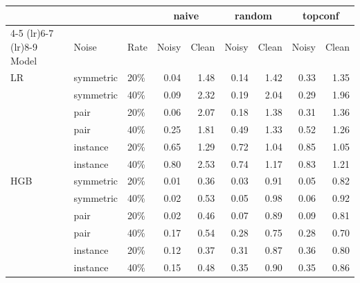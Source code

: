 \begin{tabular}{lllrrrrrr}
\toprule
 & & & \multicolumn{2}{c}{naive} & \multicolumn{2}{c}{random} & \multicolumn{2}{c}{topconf} \\
\cmidrule(lr){4-5} \cmidrule(lr){6-7} \cmidrule(lr){8-9}
Model & Noise & Rate & Noisy & Clean & Noisy & Clean & Noisy & Clean \\
\midrule
LR & symmetric & 20\% & 0.04 & 1.48 & 0.14 & 1.42 & 0.33 & 1.35 \\
 & symmetric & 40\% & 0.09 & 2.32 & 0.19 & 2.04 & 0.29 & 1.96 \\
 & pair & 20\% & 0.06 & 2.07 & 0.18 & 1.38 & 0.31 & 1.36 \\
 & pair & 40\% & 0.25 & 1.81 & 0.49 & 1.33 & 0.52 & 1.26 \\
 & instance & 20\% & 0.65 & 1.29 & 0.72 & 1.04 & 0.85 & 1.05 \\
 & instance & 40\% & 0.80 & 2.53 & 0.74 & 1.17 & 0.83 & 1.21 \\
\addlinespace
HGB & symmetric & 20\% & 0.01 & 0.36 & 0.03 & 0.91 & 0.05 & 0.82 \\
 & symmetric & 40\% & 0.02 & 0.53 & 0.05 & 0.98 & 0.06 & 0.92 \\
 & pair & 20\% & 0.02 & 0.46 & 0.07 & 0.89 & 0.09 & 0.81 \\
 & pair & 40\% & 0.17 & 0.54 & 0.28 & 0.75 & 0.28 & 0.70 \\
 & instance & 20\% & 0.12 & 0.37 & 0.31 & 0.87 & 0.36 & 0.80 \\
 & instance & 40\% & 0.15 & 0.48 & 0.35 & 0.90 & 0.35 & 0.86 \\
\bottomrule
\end{tabular}
